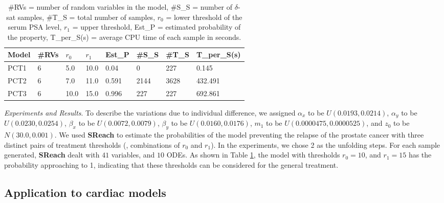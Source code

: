\begin{table}[h]
\centering
    \begin{tabular}{|l|l|l|l|l|l|l|l|}
    \hline
    Model & \#RVs & $r_0$ & $r_1$ & Est\_P & \#S\_S & \#T\_S & T\_per\_S(s) \\ \hline
    PCT1  & 6     & 5.0  & 10.0 & 0.04   & 0      & 227    & 0.145        \\ \hline
    PCT2  & 6     & 7.0  & 11.0 & 0.591  & 2144   & 3628   & 432.491      \\ \hline
    PCT3  & 6     & 10.0 & 15.0 & 0.996  & 227    & 227    & 692.861      \\ \hline
    \end{tabular}
    \caption {\#RVs = number of random variables in the model, \#S\_S = number of $\delta$-sat samples, 
\#T\_S = total number of samples, $r_0$ = lower threshold of the serum PSA level, $r_1$ = upper threshold, 
Est\_P = estimated probability of the property, T\_per\_S(s) = average CPU time of each sample in seconds.}
    \label{table:prostate}
\end{table}

\textit{Experiments and Results}. To describe the variations due to individual difference, we assigned $\alpha_x$ to be $U(0.0193, 0.0214)$, $\alpha_y$ to be $U(0.0230, 0.0254)$, $\beta_x$ to be $U(0.0072, 0.0079)$, $\beta_y$ to be $U(0.0160, 0.0176)$, $m_1$ to be $U(0.0000475, 0.0000525) $, and $z_0$ to be $N(30.0, 0.001)$. 
We used {\bf SReach} to estimate the probabilities of the model preventing the relapse of the prostate cancer with three distinct pairs of treatment thresholds (\ie, combinations of $r_0$ and $r_1$).  In the experiments, we chose 2 as the unfolding steps. For each sample generated, {\bf SReach} dealt with $41$ variables, and $10$ ODEs. As shown in Table \ref{table:prostate}, the model with thresholds $r_0 = 10$, and $r_1 = 15$ has the probability approaching to 1, indicating that these thresholds can be considered for the general treatment. 

\subsection{Application to cardiac models}

